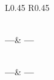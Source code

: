 

\begin{longtable}{L{0.45\linewidth} R{0.45\linewidth}}
\caption{---}
\label{---}
\\
\toprule
\textbf{---}& \textbf{---}\\   
\midrule                        
\endfirsthead
{}
\caption{Continuation}
\\
\toprule
\textbf{---}& \textbf{---}\\ 
\midrule
\endhead
\midrule
\endfoot
\bottomrule
\endlastfoot
\end{longtable}




%  
%

%
